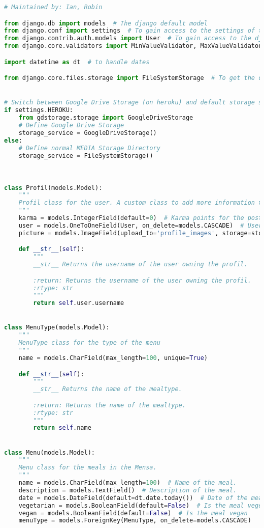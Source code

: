 \begin{lstlisting}[language=Python]
# Maintained by: Ian, Robin

from django.db import models  # The django default model
from django.conf import settings  # To gain access to the settings of the app
from django.contrib.auth.models import User  # To gain access to the django internal user
from django.core.validators import MinValueValidator, MaxValueValidator  # For the Rating to validate if the rating is in the range of 1-5

import datetime as dt  # to handle dates

from django.core.files.storage import FileSystemStorage  # To get the default storage service from django


# Switch between Google Drive Storage (on heroku) and default storage service
if settings.HEROKU:
    from gdstorage.storage import GoogleDriveStorage
    # Define Google Drive Storage
    storage_service = GoogleDriveStorage()
else:
    # Define normal MEDIA Storage Directory
    storage_service = FileSystemStorage()
    


class Profil(models.Model):
    """
    Profil class for the user. A custom class to add more information to the user.
    """
    karma = models.IntegerField(default=0)  # Karma points for the posts from the user. 
    user = models.OneToOneField(User, on_delete=models.CASCADE)  # User linked to the profil. -> The profil is deleted when the user is deleted.
    picture = models.ImageField(upload_to='profile_images', storage=storage_service, blank=True, null=True)  # Image of the user.

    def __str__(self):
        """
        __str__ Returns the username of the user owning the profil.

        :return: Returns the username of the user owning the profil.
        :rtype: str
        """
        return self.user.username


class MenuType(models.Model):
    """
    MenuType class for the type of the menu
    """
    name = models.CharField(max_length=100, unique=True)

    def __str__(self):
        """
        __str__ Returns the name of the mealtype.

        :return: Returns the name of the mealtype.
        :rtype: str
        """
        return self.name


class Menu(models.Model):
    """
    Menu class for the meals in the Mensa.
    """
    name = models.CharField(max_length=100)  # Name of the meal.
    description = models.TextField()  # Description of the meal.
    date = models.DateField(default=dt.date.today())  # Date of the meal. Default is the current date.
    vegetarian = models.BooleanField(default=False)  # Is the meal vegetarian?
    vegan = models.BooleanField(default=False)  # Is the meal vegan
    menuType = models.ForeignKey(MenuType, on_delete=models.CASCADE)


\end{lstlisting}
